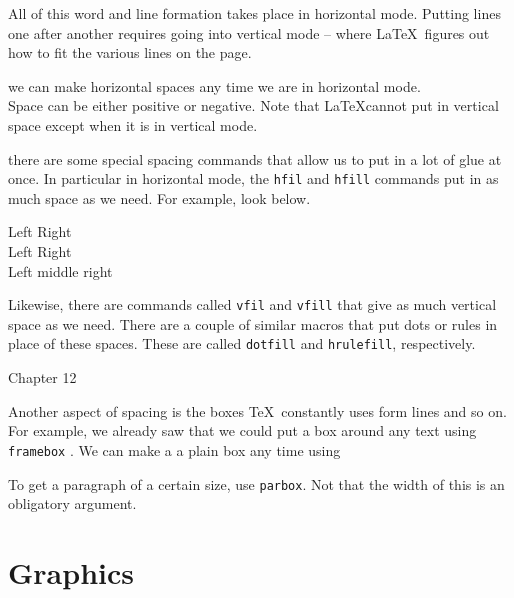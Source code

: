 \documentclass[12pt, leqno]{article}
\numberwithin{equation}{section}
\numberwithin{figure}{section}
\begin{document}
\begin{description}

All of this word and line formation takes place in horizontal mode. 
Putting lines one after another requires going into vertical mode -- where \LaTeX\ figures out how to fit the various lines on the page. 

we can make horizontal spaces \hspace{10pt} any time we are in horizontal mode. 
\vspace{0.5in} \\
Space can be either positive or negative. Note that \LaTeX cannot put in vertical space except when it is in vertical mode. 


there are some special spacing commands that allow us to put in a lot of glue at once. 
In particular in horizontal mode, the \texttt{hfil} and \texttt{hfill} commands put in as much space as we need. 
For example, look below. 
\begin{center}
Left \hfill Right \\
Left \hfil Right \\
Left \hfill middle \hfill right
\end{center}

Likewise, there are commands called \texttt{vfil} and \texttt{vfill} that give as much vertical space as we need. 
There are a couple of similar macros that put dots or rules in place of these spaces. These are called \texttt{dotfill} and \texttt{hrulefill}, respectively. 
\begin{center}
Chapter 12  
\end{center}

Another aspect of spacing is the boxes \TeX\ constantly uses form lines and so on. 
For example, we already saw that we could put a box around any text using \texttt{framebox} . 
We can make a a plain box any time using  


\parbox{2in}{To get a paragraph of a certain size, use \texttt{parbox}. Not that the width of this is an obligatory argument.}



\end{description}


\section{Graphics}
\end{document}
